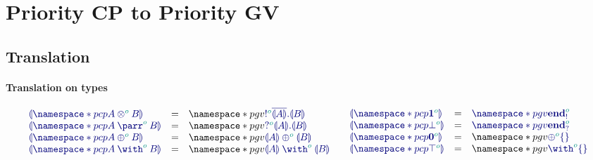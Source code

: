 \documentclass[main.tex]{subfiles}
\begin{document}
\section{Priority CP to Priority GV}

\subsection{Translation}

\paragraph{Translation on types}
\[
\begin{array}{lcl}
  \ty{\cpgvT{\pcp{\tytens[\cs{o}]{A}{B}}}}
  & = & \pgv{\ty{\tysend[\cs{o}]{\co{\cpgvT{A}}}{\cpgvT{B}}}} \\
  \ty{\cpgvT{\pcp{\typarr[\cs{o}]{A}{B}}}}
  & = & \pgv{\ty{\tyrecv[\cs{o}]{\cpgvT{A}}{\cpgvT{B}}}} \\
  \ty{\cpgvT{\pcp{\typlus[\cs{o}]{A}{B}}}}
  & = & \pgv{\ty{\tyselect[\cs{o}]{\cpgvT{A}}{\cpgvT{B}}}} \\
  \ty{\cpgvT{\pcp{\tywith[\cs{o}]{A}{B}}}}
  & = & \pgv{\ty{\tyoffer[\cs{o}]{\cpgvT{A}}{\cpgvT{B}}}}
\end{array}
\quad
\begin{array}{lcl}
  \ty{\cpgvT{\pcp{\tyone[\cs{o}]}}}
  & = & \ty{\pgv{\tyends[\cs{o}]}} \\
  \ty{\cpgvT{\pcp{\tybot[\cs{o}]}}}
  & = & \ty{\pgv{\tyendr[\cs{o}]}} \\
  \ty{\cpgvT{\pcp{\tynil[\cs{o}]}}}
  & = & \pgv{\ty{\tyselectemp[\cs{o}]}} \\
  \ty{\cpgvT{\pcp{\tytop[\cs{o}]}}}
  & = & \pgv{\ty{\tyofferemp[\cs{o}]}}
\end{array}
\]
\end{document}
